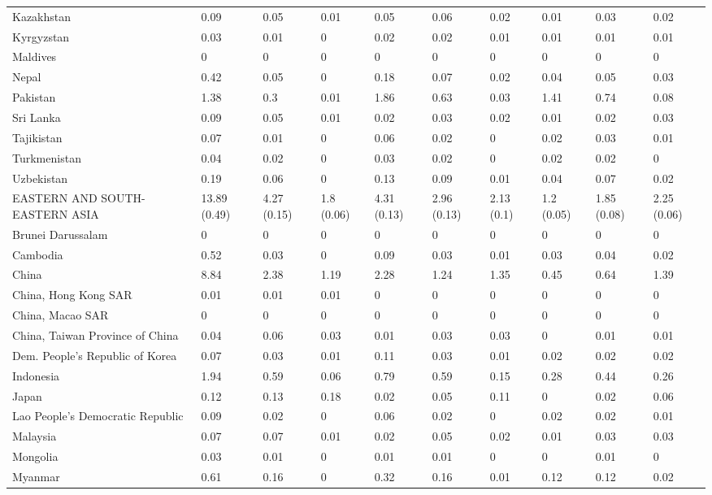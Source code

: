 \begin{longtable}[t]{llllllllll}
Kazakhstan & 0.09 & 0.05 & 0.01 & 0.05 & 0.06 & 0.02 & 0.01 & 0.03 & 0.02\\
Kyrgyzstan & 0.03 & 0.01 & 0 & 0.02 & 0.02 & 0.01 & 0.01 & 0.01 & 0.01\\
Maldives & 0 & 0 & 0 & 0 & 0 & 0 & 0 & 0 & 0\\
Nepal & 0.42 & 0.05 & 0 & 0.18 & 0.07 & 0.02 & 0.04 & 0.05 & 0.03\\
Pakistan & 1.38 & 0.3 & 0.01 & 1.86 & 0.63 & 0.03 & 1.41 & 0.74 & 0.08\\
Sri Lanka & 0.09 & 0.05 & 0.01 & 0.02 & 0.03 & 0.02 & 0.01 & 0.02 & 0.03\\
Tajikistan & 0.07 & 0.01 & 0 & 0.06 & 0.02 & 0 & 0.02 & 0.03 & 0.01\\
Turkmenistan & 0.04 & 0.02 & 0 & 0.03 & 0.02 & 0 & 0.02 & 0.02 & 0\\
Uzbekistan & 0.19 & 0.06 & 0 & 0.13 & 0.09 & 0.01 & 0.04 & 0.07 & 0.02\\
EASTERN AND SOUTH-EASTERN ASIA & 13.89 (0.49) & 4.27 (0.15) & 1.8 (0.06) & 4.31 (0.13) & 2.96 (0.13) & 2.13 (0.1) & 1.2 (0.05) & 1.85 (0.08) & 2.25 (0.06)\\
Brunei Darussalam & 0 & 0 & 0 & 0 & 0 & 0 & 0 & 0 & 0\\
Cambodia & 0.52 & 0.03 & 0 & 0.09 & 0.03 & 0.01 & 0.03 & 0.04 & 0.02\\
China & 8.84 & 2.38 & 1.19 & 2.28 & 1.24 & 1.35 & 0.45 & 0.64 & 1.39\\
China, Hong Kong SAR & 0.01 & 0.01 & 0.01 & 0 & 0 & 0 & 0 & 0 & 0\\
China, Macao SAR & 0 & 0 & 0 & 0 & 0 & 0 & 0 & 0 & 0\\
China, Taiwan Province of China & 0.04 & 0.06 & 0.03 & 0.01 & 0.03 & 0.03 & 0 & 0.01 & 0.01\\
Dem. People's Republic of Korea & 0.07 & 0.03 & 0.01 & 0.11 & 0.03 & 0.01 & 0.02 & 0.02 & 0.02\\
Indonesia & 1.94 & 0.59 & 0.06 & 0.79 & 0.59 & 0.15 & 0.28 & 0.44 & 0.26\\
Japan & 0.12 & 0.13 & 0.18 & 0.02 & 0.05 & 0.11 & 0 & 0.02 & 0.06\\
Lao People's Democratic Republic & 0.09 & 0.02 & 0 & 0.06 & 0.02 & 0 & 0.02 & 0.02 & 0.01\\
Malaysia & 0.07 & 0.07 & 0.01 & 0.02 & 0.05 & 0.02 & 0.01 & 0.03 & 0.03\\
Mongolia & 0.03 & 0.01 & 0 & 0.01 & 0.01 & 0 & 0 & 0.01 & 0\\
Myanmar & 0.61 & 0.16 & 0 & 0.32 & 0.16 & 0.01 & 0.12 & 0.12 & 0.02\\

\end{longtable}
